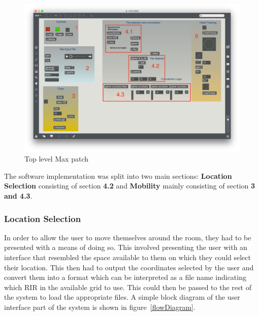 \documentclass[../../main.tex]{subfiles}
\begin{document}
				\begin{figure}[H]
					\centerline{\includegraphics[scale = 0.4]{Sections/Implementation/Max/images/Max/MyPatch_Edit.png}}
					\caption{Top level Max patch}
					\label{myPatch}
				\end{figure}

		

				The software implementation was split into two main sections: \textbf{Location Selection} consisting of section \textbf{4.2} and \textbf{Mobility} mainly consisting of section \textbf{3 and 4.3}.



		\subsubsection{Location Selection}

			In order to allow the user to move themselves around the room, they had to be presented with a means of doing so. This involved presenting the user with an interface that resembled the space available to them on which they could select their location. This then had to output the coordinates selected by the user and convert them into a format which can be interpreted as a file name indicating which \ac{RIR} in the available grid to use. This could then be passed to the rest of the system to load the appropriate files. A simple block diagram of the user interface part of the system is shown in figure~\ref{flowDiagram}.
\end{document}
